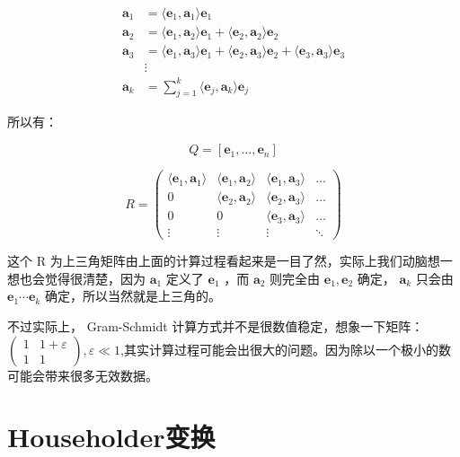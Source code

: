 \documentclass[
]{book}
\begin{document}
\[
\begin{aligned}
\mathbf {a} _{1}&=\langle \mathbf {e} _{1},\mathbf {a} _{1}\rangle \mathbf {e} _{1}\\\mathbf {a} _{2}&=\langle \mathbf {e} _{1},\mathbf {a} _{2}\rangle \mathbf {e} _{1}+\langle \mathbf {e} _{2},\mathbf {a} _{2}\rangle \mathbf {e} _{2}\\\mathbf {a} _{3}&=\langle \mathbf {e} _{1},\mathbf {a} _{3}\rangle \mathbf {e} _{1}+\langle \mathbf {e} _{2},\mathbf {a} _{3}\rangle \mathbf {e} _{2}+\langle \mathbf {e} _{3},\mathbf {a} _{3}\rangle \mathbf {e} _{3}\\&\vdots \\\mathbf {a} _{k}&=\sum _{j=1}^{k}\langle \mathbf {e} _{j},\mathbf {a} _{k}\rangle \mathbf {e} _{j}
\end{aligned}
\]

所以有：

\[Q=\left[\mathbf {e} _{1},\ldots ,\mathbf {e} _{n}\right]\]

\[
R = \begin{pmatrix}\langle \mathbf {e} _{1},\mathbf {a} _{1}\rangle &\langle \mathbf {e} _{1},\mathbf {a} _{2}\rangle &\langle \mathbf {e} _{1},\mathbf {a} _{3}\rangle &\ldots \\0&\langle \mathbf {e} _{2},\mathbf {a} _{2}\rangle &\langle \mathbf {e} _{2},\mathbf {a} _{3}\rangle &\ldots \\0&0&\langle \mathbf {e} _{3},\mathbf {a} _{3}\rangle &\ldots \\\vdots &\vdots &\vdots &\ddots \end{pmatrix}
\]

这个 R 为上三角矩阵由上面的计算过程看起来是一目了然，实际上我们动脑想一想也会觉得很清楚，因为 \(\mathbf{a}_{1}\) 定义了 \(\mathbf{e}_{1}\) ，而 \(\mathbf{a} _{2}\) 则完全由 \(\mathbf{e}_{1}, \mathbf{e}_{2}\) 确定， \(\mathbf{a}_{k}\) 只会由 \(\mathbf{e}_{1} \cdots \mathbf {e}_{k}\) 确定，所以当然就是上三角的。

不过实际上， Gram-Schmidt 计算方式并不是很数值稳定，想象一下矩阵：\(\begin{pmatrix} 1 & 1 + \varepsilon \\ 1 & 1\end{pmatrix}, \varepsilon \ll 1\),其实计算过程可能会出很大的问题。因为除以一个极小的数可能会带来很多无效数据。

\hypertarget{householderux53d8ux6362}{%
\section{Householder变换}\label{householderux53d8ux6362}}
\end{document}
